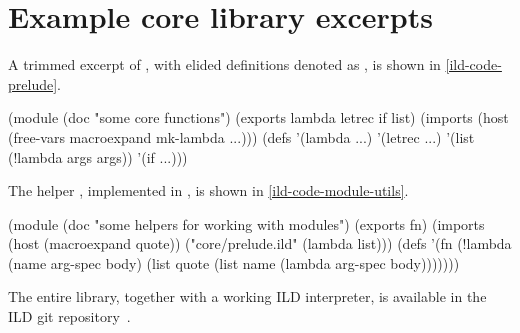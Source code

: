 \section{Example core library excerpts}
\label{ild-code-appendix}
A trimmed excerpt of , with elided definitions
denoted as , is shown in \cref{ild-code-prelude}.
\begin{listingbox}\begin{ildcode}
(module
  (doc "some core functions")
  (exports lambda letrec if list)
  (imports
    (host
      (free-vars macroexpand mk-lambda ...)))
  (defs
    '(lambda ...)
    '(letrec ...)
    '(list (!lambda args args))
    '(if ...)))
\end{ildcode}\end{listingbox}
\label{ild-code-prelude}
The helper , implemented in , is shown in \cref{ild-code-module-utils}.
\begin{listingbox}\begin{ildcode}
(module
  (doc "some helpers for working with modules")
  (exports fn)
  (imports
    (host
      (macroexpand quote))
    ("core/prelude.ild"
      (lambda list)))
  (defs
    '(fn (!lambda (name arg-spec body)
      (list quote
        (list
          name
          (lambda arg-spec body)))))))
\end{ildcode}\end{listingbox}
\label{ild-code-module-utils}

The entire library, together with a working ILD interpreter,
is available in the ILD git repository~\cite{ild-repo}.
